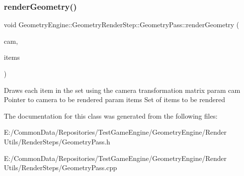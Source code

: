 \subsubsection{\texorpdfstring{renderGeometry()}{renderGeometry()}}
{\footnotesize\ttfamily void Geometry\+Engine\+::\+Geometry\+Render\+Step\+::\+Geometry\+Pass\+::render\+Geometry (\begin{DoxyParamCaption}\item[{\mbox{\hyperlink{class_geometry_engine_1_1_geometry_world_item_1_1_geometry_camera_1_1_camera}{Geometry\+World\+Item\+::\+Geometry\+Camera\+::\+Camera}} $\ast$}]{cam,  }\item[{std\+::unordered\+\_\+set$<$ \mbox{\hyperlink{class_geometry_engine_1_1_geometry_world_item_1_1_geometry_item_1_1_geometry_item}{Geometry\+World\+Item\+::\+Geometry\+Item\+::\+Geometry\+Item}} $\ast$ $>$ $\ast$}]{items }\end{DoxyParamCaption})\hspace{0.3cm}{\ttfamily [protected]}}

Draws each item in the set using the camera transformation matrix param cam Pointer to camera to be rendered param items Set of items to be rendered 

The documentation for this class was generated from the following files\+:\begin{DoxyCompactItemize}
\item 
E\+:/\+Common\+Data/\+Repositories/\+Test\+Game\+Engine/\+Geometry\+Engine/\+Render Utils/\+Render\+Steps/Geometry\+Pass.\+h\item 
E\+:/\+Common\+Data/\+Repositories/\+Test\+Game\+Engine/\+Geometry\+Engine/\+Render Utils/\+Render\+Steps/Geometry\+Pass.\+cpp\end{DoxyCompactItemize}
